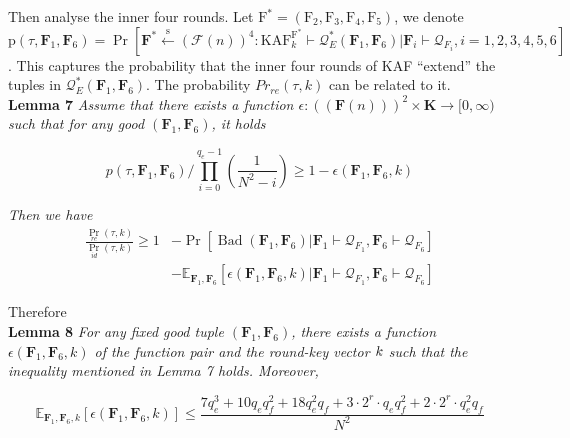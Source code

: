 Then analyse the inner four rounds. Let $\mathrm{F}^* = (\mathrm{F}_2, \mathrm{F}_3, \mathrm{F}_4, \mathrm{F}_5)$, we denote $\mathrm{p}\left(\tau, \mathbf{F}_{1}, \mathbf{F}_{6}\right)=\operatorname{Pr}\left[\mathbf{F}^{*} \stackrel{\mathrm{s}}{\leftarrow}(\mathcal{F}(n))^{4}: \mathrm{KAF}_{k}^{\mathrm{F}^{*}} \vdash \mathcal{Q}_{E}^{*}\left(\mathbf{F}_{1}, \mathbf{F}_{6}\right) | \mathbf{F}_{i} \vdash \mathcal{Q}_{F_{i}}, i=1,2,3,4,5,6\right]$. This captures the probability that the inner four rounds of KAF ``extend''  the tuples in $\mathcal{Q}_{E}^{*}\left(\mathbf{F}_{1}, \mathbf{F}_{6}\right)$. The probability $Pr_{re}(\tau, k)$ can be related to it.\\

\noindent \textbf{Lemma 7} \emph{Assume that there exists a function $\epsilon : ((\mathbf{F}(n)))^2 \times \mathbf{K} \rightarrow [ 0, \infty)$ such that for any good $(\mathbf{F}_{1}, \mathbf{F}_{6})$, it holds}

$$
p\left(\tau, \mathbf{F}_{1}, \mathbf{F}_{6}\right) / \prod_{i=0}^{q_{e}-1}\left(\frac{1}{N^{2}-i}\right) \geq 1-\epsilon\left(\mathbf{F}_{1}, \mathbf{F}_{6}, k\right)
$$

\emph{Then we have}
$$
\begin{aligned}
\frac{\operatorname{Pr}_{r e}(\tau, k)}{\operatorname{Pr}_{i d}(\tau, k)} \geq 1 &-\operatorname{Pr}\left[\operatorname{Bad}\left(\mathbf{F}_{1}, \mathbf{F}_{6}\right) | \mathbf{F}_{1} \vdash \mathcal{Q}_{F_{1}}, \mathbf{F}_{6} \vdash \mathcal{Q}_{F_{6}}\right] \\
&-\mathbb{E}_{\mathbf{F}_{1}, \mathbf{F}_{6}}\left[\epsilon\left(\mathbf{F}_{1}, \mathbf{F}_{6}, k\right) | \mathbf{F}_{1} \vdash \mathcal{Q}_{F_{1}}, \mathbf{F}_{6} \vdash \mathcal{Q}_{F_{6}}\right]
\end{aligned}
$$

Therefore\\

\noindent \textbf{Lemma 8} \emph{ For any fixed good tuple $(\mathbf{F}_{1}, \mathbf{F}_{6})$, there exists a function $\epsilon\left(\mathbf{F}_{1}, \mathbf{F}_{6}, k\right)$ of the function pair and the round-key vector $\mathnormal{k}$ such that the inequality mentioned in Lemma 7 holds. Moreover,}

$$
\mathbb{E}_{\mathbf{F}_{1}, \mathbf{F}_{6}, k}\left[\epsilon\left(\mathbf{F}_{1}, \mathbf{F}_{6}, k\right)\right] \leq \frac{7 q_{e}^{3}+10 q_{e} q_{f}^{2}+18 q_{e}^{2} q_{f}+3 \cdot 2^{r} \cdot q_{e} q_{f}^{2}+2 \cdot 2^{r} \cdot q_{e}^{2} q_{f}}{N^{2}}
$$

